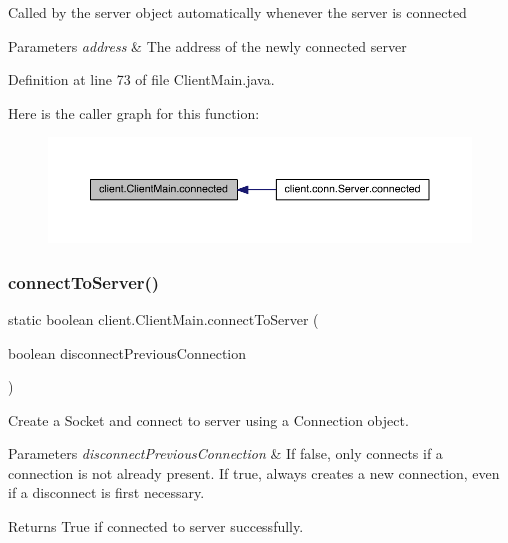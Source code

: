 Called by the {\ttfamily server} object automatically whenever the server is connected


\begin{DoxyParams}{Parameters}
{\em address} & The address of the newly connected server \\
\hline
\end{DoxyParams}


Definition at line 73 of file Client\+Main.\+java.

Here is the caller graph for this function\+:
\nopagebreak
\begin{figure}[H]
\begin{center}
\leavevmode
\includegraphics[width=350pt]{classclient_1_1_client_main_a37085a4271a663544855402f2892fb51_icgraph}
\end{center}
\end{figure}
\hypertarget{classclient_1_1_client_main_aecd59c193bdb0536d649be78f72149b0}{}\label{classclient_1_1_client_main_aecd59c193bdb0536d649be78f72149b0} 
\subsubsection{\texorpdfstring{connect\+To\+Server()}{connectToServer()}}
{\footnotesize\ttfamily static boolean client.\+Client\+Main.\+connect\+To\+Server (\begin{DoxyParamCaption}\item[{boolean}]{disconnect\+Previous\+Connection }\end{DoxyParamCaption})\hspace{0.3cm}{\ttfamily [static]}}

Create a {\ttfamily Socket} and connect to server using a {\ttfamily Connection} object.


\begin{DoxyParams}{Parameters}
{\em disconnect\+Previous\+Connection} & If false, only connects if a connection is not already present. If true, always creates a new connection, even if a disconnect is first necessary. \\
\hline
\end{DoxyParams}
\begin{DoxyReturn}{Returns}
True if connected to server successfully. 
\end{DoxyReturn}


